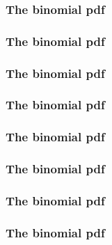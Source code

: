 \begin{frame}[fragile]\frametitle{The binomial pdf}


\end{frame}

\begin{frame}[fragile]\frametitle{The binomial pdf}


\end{frame}

\begin{frame}[fragile]\frametitle{The binomial pdf}


\end{frame}

\begin{frame}[fragile]\frametitle{The binomial pdf}


\end{frame}

\begin{frame}[fragile]\frametitle{The binomial pdf}


\end{frame}

\begin{frame}[fragile]\frametitle{The binomial pdf}


\end{frame}

\begin{frame}[fragile]\frametitle{The binomial pdf}


\end{frame}

\begin{frame}[fragile]\frametitle{The binomial pdf}


\end{frame}


